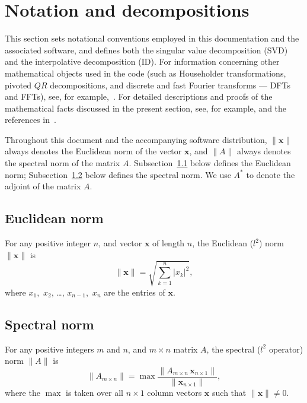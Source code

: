 ﻿\documentclass[letterpaper,12pt]{article}
\def\x{\mathbf{x}}
\begin{document}
\section{Notation and decompositions}
\label{defs}

This section sets notational conventions employed
in this documentation and the associated software,
and defines both the singular value decomposition (SVD)
and the interpolative decomposition (ID).
For information concerning other mathematical objects
used in the code (such as Householder transformations,
pivoted $QR$ decompositions, and discrete and fast Fourier transforms
--- DFTs and FFTs), see, for example,~\cite{golub-van_loan}.
For detailed descriptions and proofs of the mathematical facts
discussed in the present section, see, for example,
\cite{golub-van_loan} and the references
in~\cite{halko-martinsson-tropp}.

Throughout this document and the accompanying software distribution,
$\| \x \|$ always denotes the Euclidean norm of the vector $\x$,
and $\| A \|$ always denotes the spectral norm of the matrix $A$.
Subsection~\ref{Euclidean} below defines the Euclidean norm;
Subsection~\ref{spectral} below defines the spectral norm.
We use $A^*$ to denote the adjoint of the matrix $A$.


\subsection{Euclidean norm}
\label{Euclidean}

For any positive integer $n$, and vector $\x$ of length $n$,
the Euclidean ($l^2$) norm $\| \x \|$ is
%
\begin{equation}
\| \x \| = \sqrt{ \sum_{k=1}^n |x_k|^2 },
\end{equation}
%
where $x_1$,~$x_2$, \dots, $x_{n-1}$,~$x_n$ are the entries of $\x$.


\subsection{Spectral norm}
\label{spectral}

For any positive integers $m$ and $n$, and $m \times n$ matrix $A$,
the spectral ($l^2$ operator) norm $\| A \|$ is
%
\begin{equation}
\| A_{m \times n} \|
= \max \frac{\| A_{m \times n} \, \x_{n \times 1} \|}
            {\| \x_{n \times 1} \|},
\end{equation}
%
where the $\max$ is taken over all $n \times 1$ column vectors $\x$
such that $\| \x \| \ne 0$.
\end{document}
